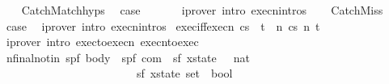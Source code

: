 \begin{isabellebody}
\ \ \isamarkupfalse%
\ CatchMatch{\isachardot}hyps\ \isamarkupfalse%
\ {\isacharquery}case\ \isanewline
\ \ \ \ \isamarkupfalse%
\ {\isacharparenleft}iprover\ intro{\isacharcolon}\ execn{\isachardot}intros{\isacharparenright}\isanewline
{}\isamarkupfalse%
\isanewline
\ \ \isamarkupfalse%
\ CatchMiss\ \isamarkupfalse%
\ {\isacharquery}case\ \isamarkupfalse%
\ {\isacharparenleft}iprover\ intro{\isacharcolon}\ execn{\isachardot}intros{\isacharparenright}\isanewline
{}\isamarkupfalse%
%
\endisatagproof
{\isafoldproof}%
%
\isadelimproof
\isanewline
%
\endisadelimproof
\isanewline
{}\isamarkupfalse%
\ exec{\isacharunderscore}iff{\isacharunderscore}execn{\isacharcolon}\ {\isachardoublequoteopen}{\isacharparenleft}{\isasymGamma}{\isasymturnstile}{\isasymlangle}c{\isacharcomma}s{\isasymrangle}\ {\isasymRightarrow}\ t{\isacharparenright}\ {\isacharequal}\ {\isacharparenleft}{\isasymexists}n{\isachardot}\ {\isasymGamma}{\isasymturnstile}{\isasymlangle}c{\isacharcomma}s{\isasymrangle}\ {\isacharequal}n{\isasymRightarrow}\ t{\isacharparenright}{\isachardoublequoteclose}\isanewline
%
\isadelimproof
\ \ %
\endisadelimproof
%
\isatagproof
{}\isamarkupfalse%
\ {\isacharparenleft}iprover\ intro{\isacharcolon}\ exec{\isacharunderscore}to{\isacharunderscore}execn\ execn{\isacharunderscore}to{\isacharunderscore}exec{\isacharparenright}%
\endisatagproof
{\isafoldproof}%
%
\isadelimproof
\isanewline
%
\endisadelimproof
\isanewline
\isanewline
{}\isamarkupfalse%
\ nfinal{\isacharunderscore}notin{\isacharcolon}{\isacharcolon}\ {\isachardoublequoteopen}{\isacharparenleft}{\isacharprime}s{\isacharcomma}{\isacharprime}p{\isacharcomma}{\isacharprime}f{\isacharparenright}\ body\ {\isasymRightarrow}\ {\isacharparenleft}{\isacharprime}s{\isacharcomma}{\isacharprime}p{\isacharcomma}{\isacharprime}f{\isacharparenright}\ com\ {\isasymRightarrow}\ {\isacharparenleft}{\isacharprime}s{\isacharcomma}{\isacharprime}f{\isacharparenright}\ xstate\ {\isasymRightarrow}\ \ nat\ \isanewline
\ \ \ \ \ \ \ \ \ \ \ \ \ \ \ \ \ \ \ \ \ \ \ {\isasymRightarrow}\ {\isacharparenleft}{\isacharprime}s{\isacharcomma}{\isacharprime}f{\isacharparenright}\ xstate\ set\ {\isasymRightarrow}\ bool{\isachardoublequoteclose}\isanewline
\ \ {\isacharparenleft}{\isachardoublequoteopen}{\isacharunderscore}{\isasymturnstile}\ {\isasymlangle}{\isacharunderscore}{\isacharcomma}{\isacharunderscore}{\isasymrangle}\ {\isacharequal}{\isacharunderscore}{\isasymRightarrow}{\isasymnotin}{\isacharunderscore}{\isachardoublequoteclose}\ \ {\isacharbrackleft}{}{}{\isacharcomma}{}{}{\isacharcomma}{}{}{\isacharcomma}{}{}{\isacharcomma}{}{}{\isacharbrackright}\ {}{}{\isacharparenright}\ \isanewline

\end{isabellebody}
